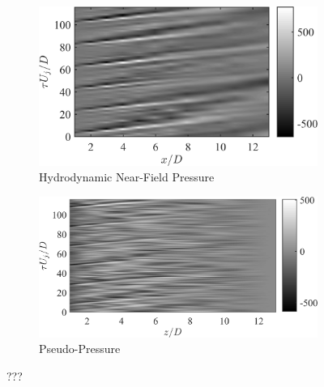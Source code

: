 \begin{figure}
	\centering
	\begin{subfigure}{.5\textwidth}
		\centering
		\includegraphics[width=0.95\linewidth]{Figures/ch5_St005_nearfield_wvpkts.png}
		\caption{Hydrodynamic Near-Field Pressure}
	\end{subfigure}%
	\begin{subfigure}{.5\textwidth}
		\centering
		\includegraphics[width=0.95\linewidth]{Figures/ch5_St005_flowfield_wvpkts.png}
		\caption{Pseudo-Pressure}
	\end{subfigure}
	\caption{???}
	\label{fig:flowfield_wvpkts}
\end{figure}

